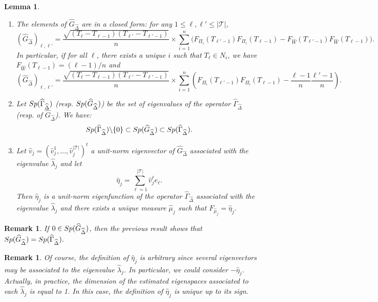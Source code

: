\documentclass[aos]{imsart}
\theoremstyle{plain}
\newtheorem{lemma}[theorem]{Lemma}
\newtheorem{remark}[theorem]{Remark}
\theoremstyle{remark}
\newcommand{\1}{1}
\begin{document}
\begin{lemma}\label{eq:construct_GDelta}
\text{}
\begin{enumerate}
\item The elements of $\widehat G_{\widehat\Delta}$ are in a closed form: for any $1\leq\ell,\ell'\leq |\mathcal{T} |$,
$$\left( \widehat G_{\widehat\Delta} \right)_{\ell, \ell'}=
			\frac{\sqrt{(T_\ell-T_{\ell-1})(T_{\ell'}-T_{\ell'-1})}}{n}  \times  \sum_{i=1}^n\Big(F_{\Pi_i}(T_{\ell'-1})F_{\Pi_i}(T_{\ell-1}) -F_{\widehat W} (T_{\ell'-1})F_{\widehat W}(T_{\ell-1})\Big).
$$
In particular, if for all $\ell$, there exists a unique $i$ such that $T_\ell\in N_i$, we have $F_{\widehat W}(T_{\ell-1})=(\ell-1)/n$ and
$$\left( \widehat G_{\widehat\Delta} \right)_{\ell, \ell'}=
			\frac{\sqrt{(T_\ell-T_{\ell-1})(T_{\ell'}-T_{\ell'-1})}}{n}  \times  \sum_{i=1}^n\left(F_{\Pi_i}(T_{\ell'-1})F_{\Pi_i}(T_{\ell-1}) -\frac{\ell-1}n\frac{\ell'-1}n\right).
$$
\item Let ${\rm Sp}(\widehat\Gamma_{\widehat\Delta})$ (resp. ${\rm Sp}(\widehat G_{\widehat\Delta})$) be the set of eigenvalues of the operator $\widehat\Gamma_{\widehat \Delta}$ (resp. of $\widehat G_{\widehat\Delta}$). We have:
\[
{\rm Sp}(\widehat\Gamma_{\widehat\Delta})\backslash\{0\}\subset {\rm Sp}(\widehat G_{\widehat\Delta})\subset {\rm Sp}(\widehat\Gamma_{\widehat\Delta}). 
\]
\item Let $\widehat v_j=(\widehat v_j^1,\hdots,\widehat v_j^{|\mathcal{T}|})^t$ a unit-norm eigenvector of $\widehat G_{\widehat\Delta}$ associated with the eigenvalue $\widehat\lambda_j$ and let
	$$
	\widehat\eta_j = \sum_{\ell=1}^{|\mathcal{T}|}\widehat v_j^\ell e_\ell. 
	$$
	Then $\widehat\eta_j$ is a unit-norm eigenfunction of the operator $\widehat\Gamma_{\widehat\Delta}$ associated with the eigenvalue $\widehat\lambda_j$ and there exists a unique measure $\widehat\mu_j$ such that  $F_{\widehat\mu_j} = \widehat\eta_j. $
\end{enumerate}
\end{lemma}
\begin{remark}
If $0\in{\rm Sp}(\widehat G_{\widehat\Delta})$, then the previous result shows that ${\rm Sp}(\widehat G_{\widehat\Delta})= {\rm Sp}(\widehat\Gamma_{\widehat\Delta}).$
\end{remark}
\begin{remark}
Of course, the definition of $\widehat\eta_j$ is arbitrary since several eigenvectors may be associated to the eigenvalue $\widehat\lambda_j$. In particular, we could consider $-\widehat\eta_j$. Actually, in practice, the dimension of the estimated eigenspaces associated to each $\widehat\lambda_j$ is equal to 1. In this case, the definition of $\widehat\eta_j$ is unique up to its sign.
\end{remark}
\end{document}
